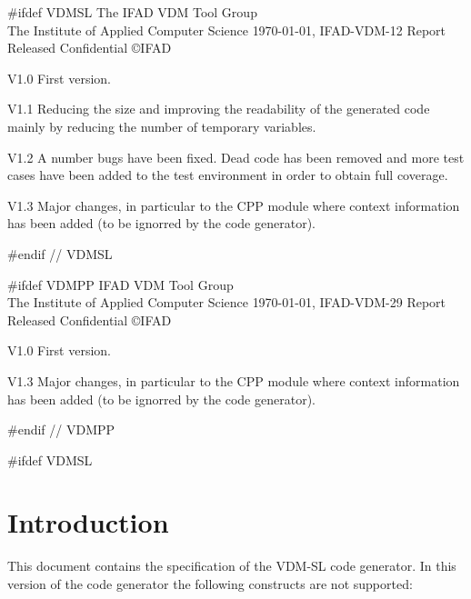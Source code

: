 \documentclass[a4paper,dvips]{article}
\begin{document}

#ifdef VDMSL
{ The IFAD VDM Tool Group \\
  The Institute of Applied Computer Science}
{\today,}
{IFAD-VDM-12}
{Report}
{Released}
{Confidential}
{}
{\copyright IFAD}
{\item[V1.0] First version.
\item [V1.1] Reducing the size and improving the readability
  of the generated code mainly by reducing the number of
  temporary variables. 
\item [V1.2] A number bugs have been fixed. Dead code has been removed
  and more test cases have been added to the test environment in order
  to obtain full coverage.
\item[V1.3] Major changes, in particular to the CPP module where
context information has been added (to be ignorred by the code generator). } 
{}
#endif // VDMSL

#ifdef VDMPP
         {IFAD VDM Tool Group \\
          The Institute of Applied Computer Science}
         {\today,}
         {IFAD-VDM-29}
         {Report}
         {Released}
         {Confidential}
         {}
         {\copyright IFAD}
         {\item[V1.0] First version.
	 \item[V1.3] Major changes, in particular to the CPP module where
context information has been added (to be ignorred by the code generator).}
         {}
#endif // VDMPP
\renewcommand{\thepage}{\roman{page}}

\tableofcontents
\newpage
\renewcommand{\thepage}{\arabic{page}}
\setcounter{page}{1}

\parskip12pt
\parindent0pt

#ifdef VDMSL
\section{Introduction}

This document contains the specification of the VDM-SL code generator.
In this version of the code generator the following constructs are
not supported:
\end{document}
